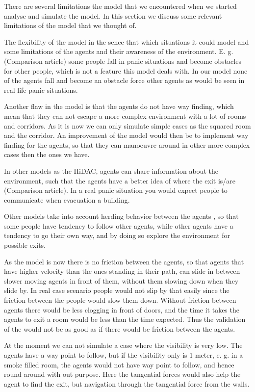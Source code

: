 There are several limitations the model that we encountered when we started 
analyse and simulate the model. In this section we discuss some relevant 
limitations of the model that we thought of.

The flexibility of the model in the sence that which situations it could model 
and some limitations of the agents and their awareness of the environment.
E. g. (Comparison article) some people fall in panic situations and become 
obstacles for other people, which is not a feature this model deals with. In 
our model none of the agents fall and become an obstacle force other agents as 
would be seen in real life panic situations.

Another flaw in the model is that the agents do not have way finding, which 
mean that they can not escape a more complex environment with a lot of rooms 
and corridors. As it is now we can only simulate simple cases as the squared 
room and the corridor.  An improvement of the model would then be to implement 
way finding for the agents, so that they can manoeuvre around in other more 
complex cases then the ones we have.

In other models as the HiDAC, agents can share information about the 
environment, such that the agents have a better idea of where the exit is/are 
(Comparison article). In a real panic situation you would expect people to 
communicate when evacuation a building.

Other models take into account herding behavior between the agents  
\cite{helbing00}, so that some people have tendency to follow other agents, 
while other agents have a tendency to go their own way,  and by doing so 
explore the environment for possible exits.

As the model is now there is no friction between the agents, so that agents 
that have higher velocity than the ones standing in their path, can slide in 
between slower moving agents in front of them, without them slowing down when 
they slide by. In real case scenario people would not slip by that easily 
since the friction between the people would slow them down.  Without friction 
between agents there would be less clogging in front of doors, and the time it 
takes the agents to exit a room would be less than the time expected. Thus the 
validation of the would not be as good as if there would be friction between 
the agents.

At the moment we can not simulate a case where the visibility is very low. The 
agents have a way point to follow, but if the visibility only is 1 meter, e. 
g. in a smoke filled room, the  agents would not have way point to follow, and 
hence round around with out purpose. Here the tangential forces would also 
help the agent to find the exit, but navigation through the tangential force 
from the walls.
